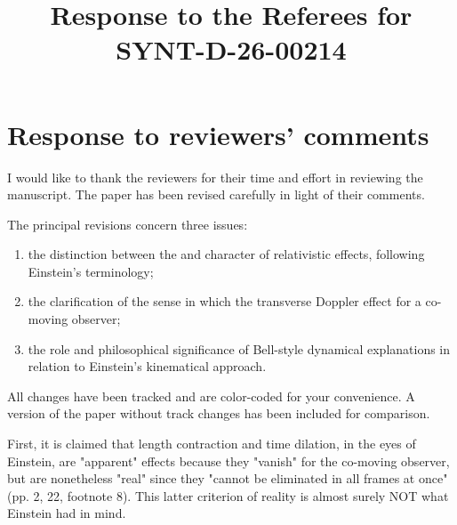 \documentclass[submitted,11pt]{article}
\title{Response to the Referees for SYNT-D-26-00214}
\begin{document}
\maketitle
\section*{Response to reviewers' comments}

\noindent I would like to thank the reviewers for their time and effort in reviewing the manuscript. The paper has been revised carefully in light of their comments.

\noindent The principal revisions concern three issues:
\begin{enumerate}
\item the distinction between the  and  character of relativistic effects, following Einstein's terminology;
\item the clarification of the sense in which the transverse Doppler effect  for a co-moving observer;
\item the role and philosophical significance of Bell-style dynamical explanations in relation to Einstein's kinematical approach.
\end{enumerate}


\noindent All changes have been tracked and are color-coded for your convenience. A version of the paper without track changes has been included for comparison.


\reviewersection

\reviewersection

\begin{point}
First, it is claimed that length contraction and time dilation, in the eyes of Einstein, are "apparent" effects because they "vanish" for the co-moving observer, but are nonetheless "real" since they "cannot be eliminated in all frames at once" (pp. 2, 22, footnote 8). This latter criterion of reality is almost surely NOT what Einstein had in mind. 
\end{point}

\end{document}
